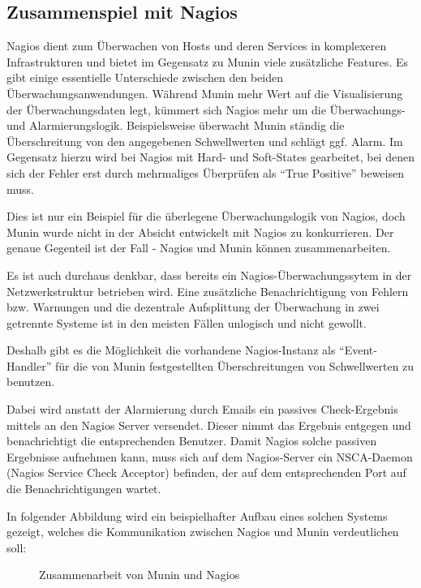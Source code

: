 \subsection{Zusammenspiel mit Nagios}

Nagios dient zum Überwachen von Hosts und deren Services in komplexeren Infrastrukturen und bietet im Gegensatz zu Munin viele zusätzliche Features.
Es gibt einige essentielle Unterschiede zwischen den beiden Überwachungsanwendungen.
Während Munin mehr Wert auf die Visualisierung der Überwachungsdaten legt, kümmert sich Nagios mehr um die Überwachungs- und Alarmierungslogik.
Beispielsweise überwacht Munin ständig die Überschreitung von den angegebenen Schwellwerten und schlägt ggf. Alarm.
Im Gegensatz hierzu wird bei Nagios mit Hard- und Soft-States gearbeitet, bei denen sich der Fehler erst durch mehrmaliges Überprüfen als "`True Positive"' beweisen muss.

Dies ist nur ein Beispiel für die überlegene Überwachungslogik von Nagios, doch Munin wurde nicht in der Absicht entwickelt mit Nagios zu konkurrieren.
Der genaue Gegenteil ist der Fall - Nagios und Munin können zusammenarbeiten.

Es ist auch durchaus denkbar, dass bereits ein Nagios-Überwachungssytem in der Netzwerkstruktur betrieben wird.
Eine zusätzliche Benachrichtigung von Fehlern bzw. Warnungen und die dezentrale Aufsplittung der Überwachung in zwei getrennte Systeme ist in den meisten Fällen unlogisch und nicht gewollt.

Deshalb gibt es die Möglichkeit die vorhandene Nagios-Instanz als "`Event-Handler"' für die von Munin festgestellten Überschreitungen von Schwellwerten zu benutzen.

Dabei wird anstatt der Alarmierung durch Emails ein passives Check-Ergebnis mittels  an den Nagios Server versendet.
Dieser nimmt das Ergebnis entgegen und benachrichtigt die entsprechenden Benutzer.
Damit Nagios solche passiven Ergebnisse aufnehmen kann, muss sich auf dem Nagios-Server ein NSCA-Daemon (Nagios Service Check Acceptor) befinden, der auf dem entsprechenden Port auf die Benachrichtigungen wartet.

In folgender Abbildung wird ein beispielhafter Aufbau eines solchen Systems gezeigt, welches die Kommunikation zwischen Nagios und Munin verdeutlichen soll:

\begin{figure}[ht]
	\centering
		\caption{Zusammenarbeit von Munin und Nagios}
		\label{nsca}
\end{figure}


